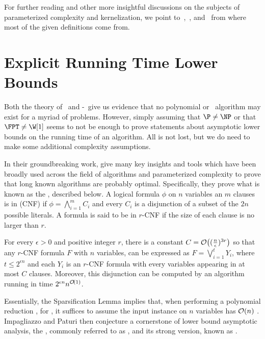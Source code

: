 For further reading and other more insightful discussions on the subjects of parameterized complexity and kernelization, we point to~\citep{downey_fellows},~\citep{cygan_parameterized}, and~\citep{book-kernels} from where most of the given definitions come from. 

\section{Explicit Running Time Lower Bounds}

Both the theory of \NPcness\ and \W[1]-\Hness\ give us evidence that no polynomial or \FPT\ algorithm may exist for a myriad of problems.
However, simply assuming that $\P \neq \NP$ or that $\FPT \neq \W[1]$ seems to not be enough to prove statements about asymptotic lower bounds on the running time of an algorithm.
All is not lost, but we do need to make some additional complexity assumptions.

In their groundbreaking work, \cite{eth} give many key insights and tools which have been broadly used across the field of algorithms and parameterized complexity to prove that long known algorithms are probably optimal.
Specifically, they prove what is known as the , described below.
A logical formula $\phi$ on $n$ variables an $m$ clauses is in  (CNF) if $\phi = \bigwedge_{i=1}^m C_i$ and every $C_i$ is a disjunction of a subset of the $2n$ possible literals.
A formula is said to be in $r$-CNF if the size of each clause is no larger than $r$.

\begin{class_definition*}
    For every $\epsilon > 0$ and positive
    integer $r$, there is a constant $C = \mathcal{O}\!\left((\frac{n}{\epsilon})^{3r}\right)$ so that any $r$-CNF formula $F$ with $n$ variables, can be expressed as $F = \bigvee_{i=1}^t Y_i$, where $t \leq 2^{\epsilon n}$ and each $Y_i$ is an $r$-CNF formula with every variables appearing in at most $C$ clauses.
    Moreover, this disjunction can be computed by an algorithm running in time $2^{\epsilon n}n^{\mathcal{O}\!\left(1\right)}$.
\end{class_definition*}

Essentially, the Sparsification Lemma implies that, when performing a polynomial reduction , for , it suffices to assume the input instance on $n$ variables has $\mathcal{O}\!\left(n\right)$ .
Impagliazzo and Paturi then conjecture a cornerstone of lower bound asymptotic analysis, the , commonly referred to as \ETH, and its strong version, known as \SETH.

